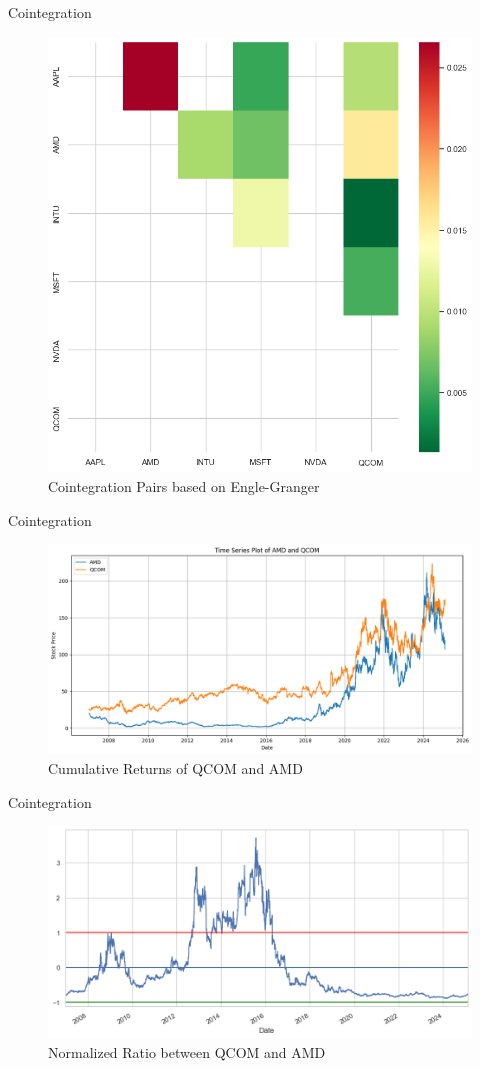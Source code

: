 \documentclass{beamer}[9pt]
\begin{document}
\begin{frame}{Cointegration}
	\begin{figure}[!h]
		\centering
		\includegraphics[width=0.55\linewidth]{plots/engle_granger.png}
		\caption{Cointegration Pairs based on Engle-Granger}
	\end{figure}
\end{frame}

\begin{frame}{Cointegration}
	\begin{figure}[!h]
		\centering
		\includegraphics[width=0.8\linewidth]{plots/QCOM_AMD.png}
		\caption{Cumulative Returns of QCOM and AMD}
		\label{fig:qcom_amd_cumulative}
	\end{figure}
\end{frame}

\begin{frame}{Cointegration}
	\begin{figure}[!h]
		\centering
		\includegraphics[width=0.8\linewidth]{plots/QCOM_AMD_ratio.png}
		\caption{Normalized Ratio between QCOM and AMD}
		\label{fig:qcom_amd_ratio}
	\end{figure}
\end{frame}
\end{document}
